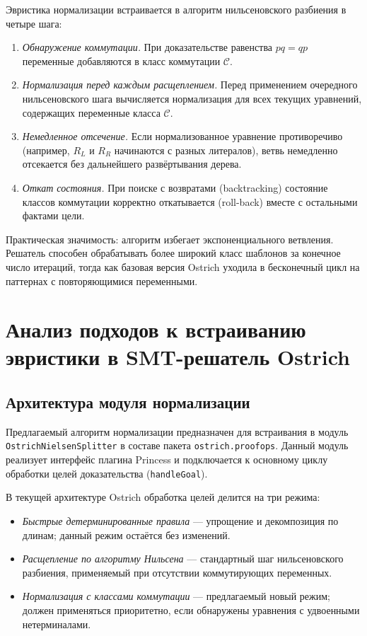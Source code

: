 \documentclass[14pt, russian]{scrartcl}
\begin{document}
Эвристика нормализации встраивается в алгоритм нильсеновского разбиения
в четыре шага:

\begin{enumerate}
\item \emph{Обнаружение коммутации.} При доказательстве равенства $pq = qp$
  переменные добавляются в класс коммутации $\mathcal{C}$.
\item \emph{Нормализация перед каждым расщеплением.} Перед применением
  очередного нильсеновского шага вычисляется нормализация для всех текущих
  уравнений, содержащих переменные класса $\mathcal{C}$.
\item \emph{Немедленное отсечение.} Если нормализованное уравнение противоречиво
  (например, $R_L$ и $R_R$ начинаются с разных литералов), ветвь немедленно
  отсекается без дальнейшего развёртывания дерева.
\item \emph{Откат состояния.} При поиске с возвратами (backtracking) состояние
  классов коммутации корректно откатывается (roll-back) вместе с остальными
  фактами цели.
\end{enumerate}

Практическая значимость: алгоритм избегает экспоненциального ветвления.
Решатель способен обрабатывать более широкий класс шаблонов за конечное
число итераций, тогда как базовая версия Ostrich уходила в бесконечный цикл
на паттернах с повторяющимися переменными.

\section{Анализ подходов к встраиванию эвристики в SMT-решатель Ostrich}

\subsection{Архитектура модуля нормализации}

Предлагаемый алгоритм нормализации предназначен для встраивания в модуль
\texttt{OstrichNielsenSplitter} в составе пакета \texttt{ostrich.proofops}.
Данный модуль реализует интерфейс плагина Princess и подключается к основному
циклу обработки целей доказательства (\texttt{handleGoal}).

В текущей архитектуре Ostrich обработка целей делится на три режима:
\begin{itemize}
\item \emph{Быстрые детерминированные правила} --- упрощение и декомпозиция
  по длинам; данный режим остаётся без изменений.
\item \emph{Расщепление по алгоритму Нильсена} --- стандартный шаг нильсеновского
  разбиения, применяемый при отсутствии коммутирующих переменных.
\item \emph{Нормализация с классами коммутации} --- предлагаемый новый режим;
  должен применяться приоритетно, если обнаружены уравнения с удвоенными
  нетерминалами.
\end{itemize}
\end{document}

